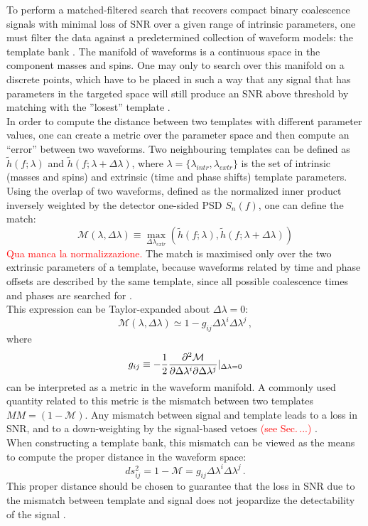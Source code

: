 \documentclass[binding=0.6cm, LaM]{sapthesis}
\newcommand{\fpg}[1]{\textcolor{red}{#1} }
\begin{document}
	To perform a matched-filtered search that recovers compact binary coalescence signals
	with minimal loss of SNR over a given range of intrinsic parameters, 
	one must filter the data against a predetermined collection of waveform models: the template bank \cite{28}.
	The manifold of waveforms is a continuous space in the component masses and spins. 
	One may only to search over this manifold on a discrete points, 
	which have to be placed in such a way that any signal
	that has parameters in the targeted space will still produce an SNR 
	above threshold by matching with the ''losest'' template \cite{27}. \\ 
	In order to compute the distance between two templates with different parameter values, 
	one can create a metric over the parameter space and then compute an ``error'' between two waveforms.
	Two neighbouring templates can be defined as $\tilde h(f;\lambda)$ and $\tilde h(f;\lambda + \Delta \lambda)$,
	where $\lambda = \{\lambda_{intr}, \lambda_{extr}\}$ is the set of 
	intrinsic (masses and spins) and extrinsic (time and phase shifts) template parameters.
	Using the overlap of two waveforms, defined as the normalized inner product inversely weighted 
	by the detector one-sided PSD $S_n(f)$, one can define the match:
		\begin{equation}
			\mathcal{M}(\lambda, \Delta \lambda) \equiv \max_{\Delta \lambda_{extr}} (\tilde h(f;\lambda), \tilde h(f;\lambda + \Delta \lambda))
		\end{equation}
        \fpg{Qua manca la normalizzazione.}
	The match is maximised only over the two extrinsic parameters of a template, 
	because waveforms related by time and phase offsets
	are described by the same template, 
	since all possible coalescence times and phases are searched for \cite{29}. \\
	This expression can be Taylor-expanded about $\Delta \lambda = 0$:
		\begin{equation}
			\mathcal{M}(\lambda, \Delta \lambda) \simeq 1 - g_{ij} \Delta \lambda^i \Delta \lambda^j\,,
		\end{equation}
	where 
		\begin{equation}
			 g_{ij} \equiv -{1 \over 2} {{\partial^2\mathcal{M}} \over {\partial  \Delta \lambda^i  \partial \Delta \lambda^j}}\vert_{\Delta \lambda = 0}
		\end{equation}
	can be interpreted as a metric in the waveform manifold.  A commonly used quantity related to this metric
	is the mismatch between two templates $MM = (1 − \mathcal{M})$.
	Any mismatch between signal and template leads to a loss in SNR, 
	and to a down-weighting by the signal-based vetoes \fpg{(see Sec.\,...)}. \\
	When constructing a template bank, this mismatch can be viewed as the means
	to compute the proper distance in the waveform space:
		\begin{equation}
			ds_{ij}^2 = 1 − \mathcal{M} = g_{ij} \Delta \lambda^i \Delta \lambda^j\,.
		\end{equation}
	This proper distance should be chosen to guarantee that the loss in SNR due to the mismatch 
	between template and signal does not jeopardize the detectability of the signal \cite{30}.
\end{document}

